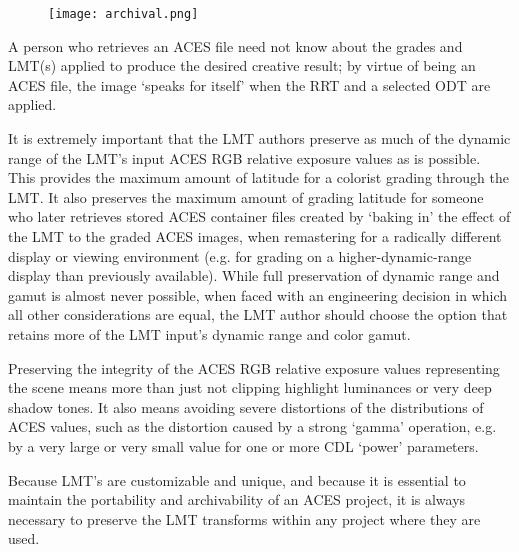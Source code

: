 \begin{figure}[H]
\begin{center}
    \texttt{[image: archival.png]}
\caption{}
\label{fig:archival}
\end{center}
\end{figure}

A person who retrieves an ACES file need not know about the grades and LMT(s) applied to produce the desired creative result; by virtue of being an ACES file, the image `speaks for itself' when the RRT and a selected ODT are applied. 

It is extremely important that the LMT authors preserve as much of the dynamic range of the LMT’s input ACES RGB relative exposure values as is possible. This provides the maximum amount of latitude for a colorist grading through the LMT. It also preserves the maximum amount of grading latitude for someone who later retrieves stored ACES container files created by ‘baking in’ the effect of the LMT to the graded ACES images, when remastering for a radically different display or viewing environment (e.g. for grading on a higher-dynamic-range display than previously available). While full preservation of dynamic range and gamut is almost never possible, when faced with an engineering decision in which all other considerations are equal, the LMT author should choose the option that retains more of the LMT input’s dynamic range and color gamut.

Preserving the integrity of the ACES RGB relative exposure values representing the scene means more than just not clipping highlight luminances or very deep shadow tones. It also means avoiding severe distortions of the distributions of ACES values, such as the distortion caused by a strong `gamma' operation, e.g. by a very large or very small value for one or more CDL `power' parameters.

Because LMT's are customizable and unique, and because it is essential to maintain the portability and archivability of an ACES project, it is always necessary to preserve the LMT transforms within any project where they are used.


